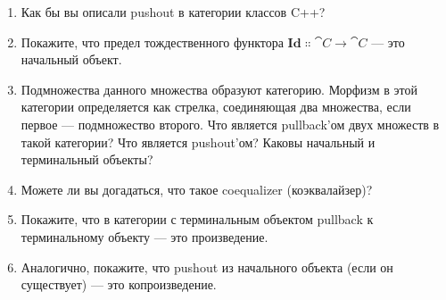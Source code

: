 \begin{enumerate}
  \tightlist
  \item
        Как бы вы описали pushout в категории классов C++?
  \item
        Покажите, что предел тождественного функтора
        $\mathbf{Id} \Colon \cat{C} \to \cat{C}$ --- это начальный объект.
  \item
        Подмножества данного множества образуют категорию. Морфизм в этой категории
        определяется как стрелка, соединяющая два множества, если первое --- подмножество
        второго. Что является pullback'ом двух множеств в такой категории?
        Что является pushout'ом? Каковы начальный и терминальный объекты?
  \item
        Можете ли вы догадаться, что такое coequalizer (коэквалайзер)?
  \item
        Покажите, что в категории с терминальным объектом pullback к
        терминальному объекту --- это произведение.
  \item
        Аналогично, покажите, что pushout из начального объекта (если он существует)
        --- это копроизведение.
\end{enumerate}
